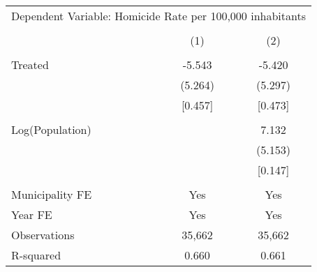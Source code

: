 \documentclass[]{article}
\begin{document}
\begin{table}[!htbp]
\centering
\begin{tabular}{lcc}
\hline
\multicolumn{3}{c}{Dependent Variable: Homicide Rate per 100,000 inhabitants} \\\\
\hline
 & (1) & (2) \\
\hline
 & & \\
Treated & -5.543 & -5.420 \\
 & (5.264) & (5.297) \\
 & [0.457] & [0.473] \\\\
Log(Population) &  & 7.132 \\
 &  & (5.153) \\
 &  & [0.147] \\
 & & \\
 \midrule
 Municipality FE & Yes & Yes \\
Year FE & Yes & Yes \\
Observations & 35,662 & 35,662 \\
R-squared & 0.660 & 0.661 \\
\hline
\end{tabular}
\end{table}
\end{document}
